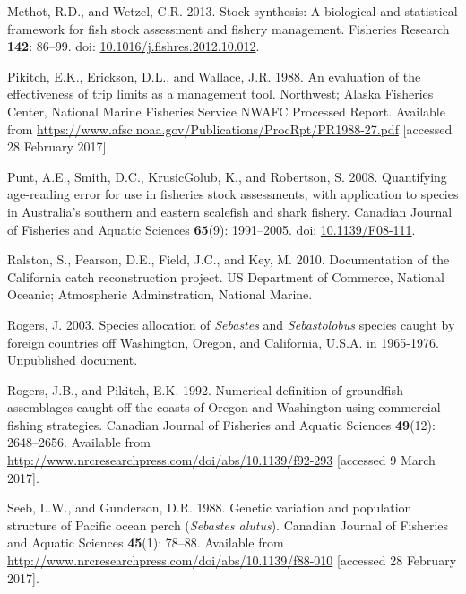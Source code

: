 \documentclass[12pt,]{article}
\begin{document}
\hypertarget{ref-methot_stock_2013}{}
Methot, R.D., and Wetzel, C.R. 2013. Stock synthesis: A biological and
statistical framework for fish stock assessment and fishery management.
Fisheries Research \textbf{142}: 86--99. doi:
\href{https://doi.org/10.1016/j.fishres.2012.10.012}{10.1016/j.fishres.2012.10.012}.

\hypertarget{ref-pikitch_evaluation_1988}{}
Pikitch, E.K., Erickson, D.L., and Wallace, J.R. 1988. An evaluation of
the effectiveness of trip limits as a management tool. Northwest; Alaska
Fisheries Center, National Marine Fisheries Service NWAFC Processed
Report. Available from
\url{https://www.afsc.noaa.gov/Publications/ProcRpt/PR1988-27.pdf}
{[}accessed 28 February 2017{]}.

\hypertarget{ref-punt_quantifying_2008}{}
Punt, A.E., Smith, D.C., KrusicGolub, K., and Robertson, S. 2008.
Quantifying age-reading error for use in fisheries stock assessments,
with application to species in Australia's southern and eastern
scalefish and shark fishery. Canadian Journal of Fisheries and Aquatic
Sciences \textbf{65}(9): 1991--2005. doi:
\href{https://doi.org/10.1139/F08-111}{10.1139/F08-111}.

\hypertarget{ref-ralston_documentation_2010}{}
Ralston, S., Pearson, D.E., Field, J.C., and Key, M. 2010. Documentation
of the California catch reconstruction project. US Department of
Commerce, National Oceanic; Atmospheric Adminstration, National Marine.

\hypertarget{ref-rogers_species_2003}{}
Rogers, J. 2003. Species allocation of \emph{Sebastes} and
\emph{Sebastolobus} species caught by foreign countries off Washington,
Oregon, and California, U.S.A. in 1965-1976. Unpublished document.

\hypertarget{ref-rogers_numerical_1992}{}
Rogers, J.B., and Pikitch, E.K. 1992. Numerical definition of groundfish
assemblages caught off the coasts of Oregon and Washington using
commercial fishing strategies. Canadian Journal of Fisheries and Aquatic
Sciences \textbf{49}(12): 2648--2656. Available from
\url{http://www.nrcresearchpress.com/doi/abs/10.1139/f92-293}
{[}accessed 9 March 2017{]}.

\hypertarget{ref-seeb_genetic_1988}{}
Seeb, L.W., and Gunderson, D.R. 1988. Genetic variation and population
structure of Pacific ocean perch (\emph{Sebastes alutus}). Canadian
Journal of Fisheries and Aquatic Sciences \textbf{45}(1): 78--88.
Available from
\url{http://www.nrcresearchpress.com/doi/abs/10.1139/f88-010}
{[}accessed 28 February 2017{]}.
\end{document}
